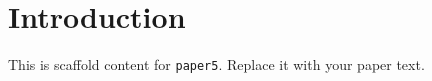 \section{Introduction}

This is scaffold content for \texttt{paper5}. Replace it with your paper text.
